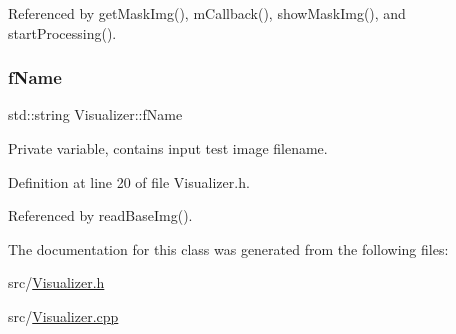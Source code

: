 Referenced by get\+Mask\+Img(), m\+Callback(), show\+Mask\+Img(), and start\+Processing().

\mbox{\label{class_visualizer_a582bb477be7e586971f02c2c8f687179}} 
\subsubsection{\texorpdfstring{fName}{fName}}
{\footnotesize\ttfamily std\+::string Visualizer\+::f\+Name\hspace{0.3cm}{\ttfamily [private]}}



Private variable, contains input test image filename. 



Definition at line 20 of file Visualizer.\+h.



Referenced by read\+Base\+Img().



The documentation for this class was generated from the following files\+:\begin{DoxyCompactItemize}
\item 
src/\mbox{\hyperlink{_visualizer_8h}{Visualizer.\+h}}\item 
src/\mbox{\hyperlink{_visualizer_8cpp}{Visualizer.\+cpp}}\end{DoxyCompactItemize}
